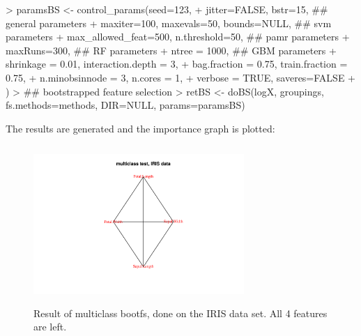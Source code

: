 \documentclass[11pt,a4paper]{article}
\begin{document}
\begin{Schunk}
\begin{Sinput}
> paramsBS <- control_params(seed=123,
+  jitter=FALSE, bstr=15,                  ## general parameters
+  maxiter=100, maxevals=50, bounds=NULL,  ## svm parameters
+  max_allowed_feat=500, n.threshold=50,   ## pamr parameters
+  maxRuns=300,                            ## RF parameters
+  ntree = 1000,                           ## GBM parameters
+  shrinkage = 0.01, interaction.depth = 3,
+  bag.fraction = 0.75, train.fraction = 0.75, 
+  n.minobsinnode = 3, n.cores = 1, 
+  verbose = TRUE, saveres=FALSE
+ )
> ## bootstrapped feature selection
> retBS <- doBS(logX, groupings, fs.methods=methods, DIR=NULL, params=paramsBS)
\end{Sinput}
\end{Schunk}

The results are generated and the importance graph is plotted:


\begin{Schunk}
\end{Schunk}


\begin{figure}[htp]
\centering
\includegraphics[width=8cm,height=6cm]{resultbsmulti}
\caption{Result of multiclass bootfs, done on the IRIS data set. All 4 features are left.}
\label{fig:resultbs}
\end{figure}
\end{document}
